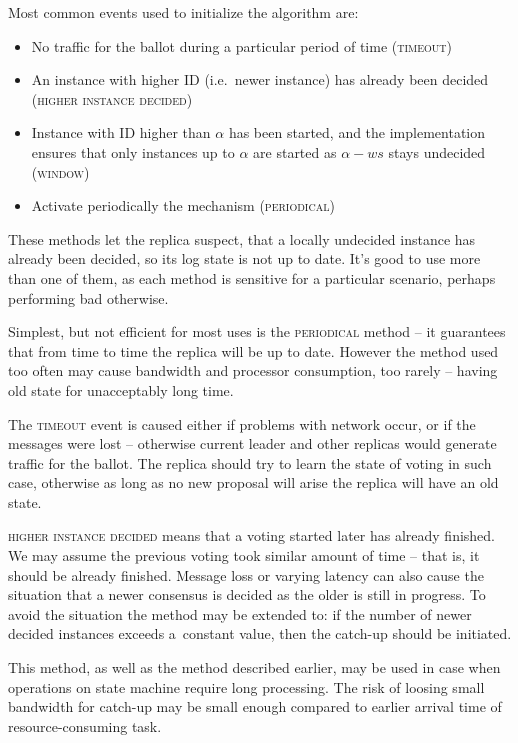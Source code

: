 Most common events used to initialize the algorithm are:
\begin{itemize}
  \item No traffic for the ballot during a particular period of time (\textsc{timeout})
  \item An instance with higher ID (i.e.\ newer instance) has already been decided \\ (\textsc{higher instance decided})
  \item Instance with ID higher than $\alpha$ has been started, and the implementation ensures that only instances up to $\alpha$ are started as $\alpha-ws$ stays undecided (\textsc{window})
  \item Activate periodically the mechanism (\textsc{periodical})
\end{itemize}

These methods let the replica suspect, that a locally undecided instance has already been decided, so its log state is not up to date. It's good to use more than one of them, as each method is sensitive for a particular scenario, perhaps performing bad otherwise.

Simplest, but not efficient for most uses is the \textsc{periodical} method -- it guarantees that from time to time the replica will be up to date.
However the method used too often may cause bandwidth and processor consumption, too rarely -- having old state for unacceptably long time.

The \textsc{timeout} event is caused either if problems with network occur, or if the \accept messages were lost -- otherwise current leader and other replicas would generate traffic for the ballot. The replica should try to learn the state of voting in such case, otherwise as long as no new proposal will arise the replica will have an old state.

\textsc{higher instance decided} means that a voting started later has already finished. We may assume the previous voting took similar amount of time -- that is, it should be already finished. Message loss or varying latency can also cause the situation that a newer consensus is decided as the older is still in progress. To avoid the situation the method may be extended to: if the number of newer decided instances exceeds a~constant value, then the catch-up should be initiated.

This method, as well as the method described earlier, may be used in case when operations on state machine require long processing. The risk of loosing small bandwidth for catch-up may be small enough compared to earlier arrival time of resource-consuming task.

